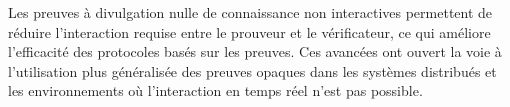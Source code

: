 Les preuves à divulgation nulle de connaissance non interactives permettent de réduire l'interaction
requise entre le prouveur et le vérificateur, ce qui améliore l'efficacité des protocoles basés sur
les preuves.
Ces avancées ont ouvert la voie à l'utilisation plus généralisée des preuves opaques dans les
systèmes distribués et les environnements où l'interaction en temps réel n'est pas possible.







